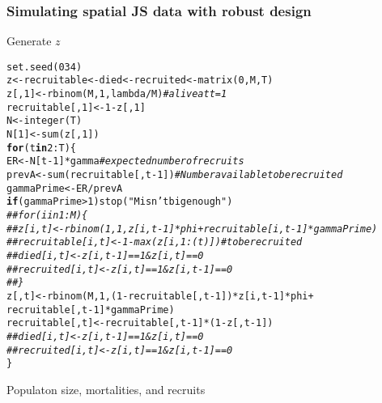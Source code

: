 \documentclass[color=usenames,dvipsnames]{beamer}\usepackage[]{graphicx}\usepackage[]{color}
\makeatletter
\newcommand{\hlnum}[1]{\textcolor[rgb]{0.69,0.494,0}{#1}}%
\newcommand{\hlstr}[1]{\textcolor[rgb]{0.749,0.012,0.012}{#1}}%
\newcommand{\hlcom}[1]{\textcolor[rgb]{0.514,0.506,0.514}{\textit{#1}}}%
\newcommand{\hlopt}[1]{\textcolor[rgb]{0,0,0}{#1}}%
\newcommand{\hlstd}[1]{\textcolor[rgb]{0,0,0}{#1}}%
\newcommand{\hlkwa}[1]{\textcolor[rgb]{0,0,0}{\textbf{#1}}}%
\newcommand{\hlkwb}[1]{\textcolor[rgb]{0,0.341,0.682}{#1}}%
\newcommand{\hlkwd}[1]{\textcolor[rgb]{0.004,0.004,0.506}{#1}}%
\newenvironment{kframe}{%
 \def\at@end@of@kframe{}%
 \ifinner\ifhmode%
  \def\at@end@of@kframe{\end{minipage}}%
  \begin{minipage}{\columnwidth}%
 \fi\fi%
 \def\FrameCommand##1{\hskip\@totalleftmargin \hskip-\fboxsep
 \colorbox{shadecolor}{##1}\hskip-\fboxsep
     \hskip-\linewidth \hskip-\@totalleftmargin \hskip\columnwidth}%
 \MakeFramed {\advance\hsize-\width
   \@totalleftmargin\z@ \linewidth\hsize
   \@setminipage}}%
 {\par\unskip\endMakeFramed%
 \at@end@of@kframe}
\newenvironment{knitrout}{}{} %
\makeatother
\begin{document}
\begin{frame}[fragile]
  \frametitle{Simulating spatial JS data with robust design}
{Generate $z$}
\begin{knitrout}\scriptsize
{}\color{fgcolor}\begin{kframe}
\begin{alltt}
\hlkwd{set.seed}\hlstd{(}\hlnum{034}\hlstd{)}
\hlstd{z} \hlkwb{<-} \hlstd{recruitable} \hlkwb{<-} \hlstd{died} \hlkwb{<-} \hlstd{recruited} \hlkwb{<-} \hlkwd{matrix}\hlstd{(}\hlnum{0}\hlstd{, M, T)}
\hlstd{z[,}\hlnum{1}\hlstd{]} \hlkwb{<-} \hlkwd{rbinom}\hlstd{(M,} \hlnum{1}\hlstd{, lambda}\hlopt{/}\hlstd{M)} \hlcom{# alive at t=1}
\hlstd{recruitable[,}\hlnum{1}\hlstd{]} \hlkwb{<-} \hlnum{1}\hlopt{-}\hlstd{z[,}\hlnum{1}\hlstd{]}
\hlstd{N} \hlkwb{<-} \hlkwd{integer}\hlstd{(T)}
\hlstd{N[}\hlnum{1}\hlstd{]} \hlkwb{<-} \hlkwd{sum}\hlstd{(z[,}\hlnum{1}\hlstd{])}
\hlkwa{for}\hlstd{(t} \hlkwa{in} \hlnum{2}\hlopt{:}\hlstd{T) \{}
    \hlstd{ER} \hlkwb{<-} \hlstd{N[t}\hlopt{-}\hlnum{1}\hlstd{]}\hlopt{*}\hlstd{gamma} \hlcom{# expected number of recruits}
    \hlstd{prevA} \hlkwb{<-} \hlkwd{sum}\hlstd{(recruitable[,t}\hlopt{-}\hlnum{1}\hlstd{])} \hlcom{# Number available to be recruited}
    \hlstd{gammaPrime} \hlkwb{<-} \hlstd{ER}\hlopt{/}\hlstd{prevA}
    \hlkwa{if}\hlstd{(gammaPrime} \hlopt{>} \hlnum{1}\hlstd{)} \hlkwd{stop}\hlstd{(}\hlstr{"M isn't big enough"}\hlstd{)}
    \hlcom{## for(i in 1:M) \{}
    \hlcom{##     z[i,t] <- rbinom(1, 1, z[i,t-1]*phi + recruitable[i,t-1]*gammaPrime)}
    \hlcom{##     recruitable[i,t] <- 1 - max(z[i,1:(t)]) # to be recruited}
    \hlcom{##     died[i,t] <- z[i,t-1]==1 & z[i,t]==0}
    \hlcom{##     recruited[i,t] <- z[i,t]==1 & z[i,t-1]==0}
    \hlcom{## \}}
    \hlstd{z[,t]} \hlkwb{<-} \hlkwd{rbinom}\hlstd{(M,} \hlnum{1}\hlstd{, (}\hlnum{1}\hlopt{-}\hlstd{recruitable[,t}\hlopt{-}\hlnum{1}\hlstd{])}\hlopt{*}\hlstd{z[i,t}\hlopt{-}\hlnum{1}\hlstd{]}\hlopt{*}\hlstd{phi} \hlopt{+}
                          \hlstd{recruitable[,t}\hlopt{-}\hlnum{1}\hlstd{]}\hlopt{*}\hlstd{gammaPrime)}
    \hlstd{recruitable[,t]} \hlkwb{<-} \hlstd{recruitable[,t}\hlopt{-}\hlnum{1}\hlstd{]}\hlopt{*}\hlstd{(}\hlnum{1}\hlopt{-}\hlstd{z[,t}\hlopt{-}\hlnum{1}\hlstd{])}
    \hlcom{## died[i,t] <- z[i,t-1]==1 & z[i,t]==0}
    \hlcom{## recruited[i,t] <- z[i,t]==1 & z[i,t-1]==0}
\hlstd{\}}
\end{alltt}
\end{kframe}
\end{knitrout}
\pause
\vfill
{\normalsize Populaton size, mortalities, and recruits}

\end{frame}
\end{document}
